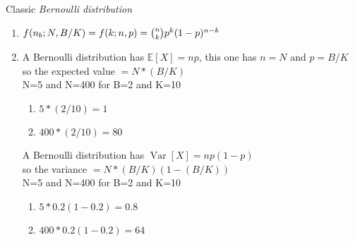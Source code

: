 \documentclass[pdftex,12pt,a4paper]{article}
\begin{document}
\begin{enumerate}
        Classic \textit{Bernoulli distribution}
        \begin{enumerate}
            \item 
                $f(n_b; N, B/K) = f(k; n, p) = \tbinom nk p^k(1-p)^{n-k}$
            \item
                A Bernoulli distribution has $\mathbb{E}[X] = np$, this one has $n = N$ and $p = B/K$\\
                so the expected value $= N * (B/K)$\\
                N=5 and N=400 for B=2 and K=10
                \begin{enumerate}
                    \item
                        $5*(2/10) = 1$\\
                    \item
                        $400*(2/10) = 80$\\
                \end{enumerate}

                A Bernoulli distribution has $\operatorname{Var}[X] = np(1-p)$\\
                so the variance $= N * (B/K)(1 - (B/K))$\\
                N=5 and N=400 for B=2 and K=10
                \begin{enumerate}
                    \item
                        $5*0.2(1-0.2) = 0.8$\\
                    \item
                        $400*0.2(1-0.2) = 64$\\
                \end{enumerate}
        \end{enumerate}

\end{enumerate}
\end{document}
